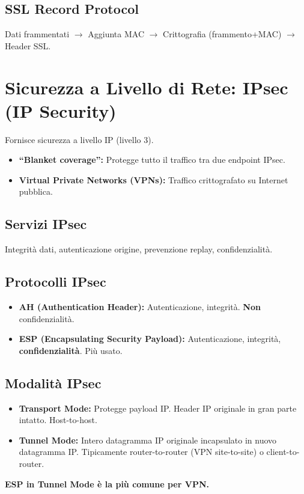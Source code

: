 \subsection{SSL Record Protocol}
Dati frammentati $\rightarrow$ Aggiunta MAC $\rightarrow$ Crittografia (frammento+MAC) $\rightarrow$ Header SSL.

\section{Sicurezza a Livello di Rete: IPsec (IP Security)}
\label{sec:ipsec}
Fornisce sicurezza a livello IP (livello 3).

\begin{itemize}
    \item \textbf{\textquotedblleft Blanket coverage\textquotedblright{}:} Protegge tutto il traffico tra due endpoint IPsec.
    \item \textbf{Virtual Private Networks (VPNs):} Traffico crittografato su Internet pubblica.
\end{itemize}

\subsection{Servizi IPsec}
Integrità dati, autenticazione origine, prevenzione replay, confidenzialità.

\subsection{Protocolli IPsec}
\begin{itemize}
    \item \textbf{AH (Authentication Header):} Autenticazione, integrità. \textbf{Non} confidenzialità.
    \item \textbf{ESP (Encapsulating Security Payload):} Autenticazione, integrità, \textbf{confidenzialità}. Più usato.
\end{itemize}

\subsection{Modalità IPsec}
\begin{itemize}
    \item \textbf{Transport Mode:} Protegge payload IP. Header IP originale in gran parte intatto. Host-to-host.
    \item \textbf{Tunnel Mode:} Intero datagramma IP originale incapsulato in nuovo datagramma IP. Tipicamente router-to-router (VPN site-to-site) o client-to-router.
\end{itemize}
\textbf{ESP in Tunnel Mode è la più comune per VPN.}

